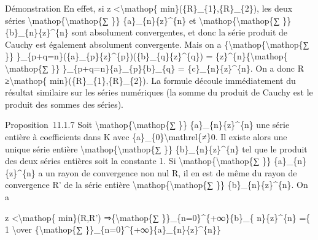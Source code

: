 \documentclass[]{article}
\begin{document}
Démonstration En effet, si \textbar{}z\textbar{}
\textless{}\textbackslash{}mathop\{ min\}(\{R\}\_\{1\},\{R\}\_\{2\}),
les deux séries \textbackslash{}mathop\{\textbackslash{}mathop\{∑ \}\}
\{a\}\_\{n\}\{z\}\^{}\{n\} et
\textbackslash{}mathop\{\textbackslash{}mathop\{∑ \}\}
\{b\}\_\{n\}\{z\}\^{}\{n\} sont absolument convergentes, et donc la
série produit de Cauchy est également absolument convergente. Mais on a
\{\textbackslash{}mathop\{\textbackslash{}mathop\{∑ \}\}
\}\_\{p+q=n\}(\{a\}\_\{p\}\{z\}\^{}\{p\})(\{b\}\_\{q\}\{z\}\^{}\{q\}) =
\{z\}\^{}\{n\}\{\textbackslash{}mathop\{ \textbackslash{}mathop\{∑ \}\}
\}\_\{p+q=n\}\{a\}\_\{p\}\{b\}\_\{q\} = \{c\}\_\{n\}\{z\}\^{}\{n\}. On a
donc R ≥\textbackslash{}mathop\{ min\}(\{R\}\_\{1\},\{R\}\_\{2\}). La
formule découle immédiatement du résultat similaire sur les séries
numériques (la somme du produit de Cauchy est le produit des sommes des
séries).

Proposition~11.1.7 Soit
\textbackslash{}mathop\{\textbackslash{}mathop\{∑ \}\}
\{a\}\_\{n\}\{z\}\^{}\{n\} une série entière à coefficients dans K avec
\{a\}\_\{0\}\textbackslash{}mathrel\{≠\}0. Il existe alors une unique
série entière \textbackslash{}mathop\{\textbackslash{}mathop\{∑ \}\}
\{b\}\_\{n\}\{z\}\^{}\{n\} tel que le produit des deux séries entières
soit la constante 1. Si
\textbackslash{}mathop\{\textbackslash{}mathop\{∑ \}\}
\{a\}\_\{n\}\{z\}\^{}\{n\} a un rayon de convergence non nul R, il en
est de même du rayon de convergence R' de la série entière
\textbackslash{}mathop\{\textbackslash{}mathop\{∑ \}\}
\{b\}\_\{n\}\{z\}\^{}\{n\}. On a

\textbar{}z\textbar{} \textless{}\textbackslash{}mathop\{ min\}(R,R')
⇒\{\textbackslash{}mathop\{∑ \}\}\_\{n=0\}\^{}\{+∞\}\{b\}\_\{
n\}\{z\}\^{}\{n\} =\{ 1 \textbackslash{}over \{\textbackslash{}mathop\{∑
\}\}\_\{n=0\}\^{}\{+∞\}\{a\}\_\{n\}\{z\}\^{}\{n\}\}
\end{document}
